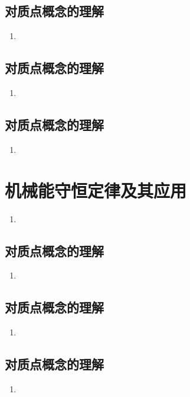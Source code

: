 \documentclass[cn,11pt]{elegantbook}
\begin{document}
\section{对质点概念的理解}
\begin{enumerate}
   \item 
\end{enumerate}

\section{对质点概念的理解}
\begin{enumerate}
   \item 
\end{enumerate}

\section{对质点概念的理解}
\begin{enumerate}
   \item 
\end{enumerate}


\chapter{机械能守恒定律及其应用}
\begin{enumerate}
   \item 
\end{enumerate}

\section{对质点概念的理解}
\begin{enumerate}
   \item 
\end{enumerate}

\section{对质点概念的理解}
\begin{enumerate}
   \item 
\end{enumerate}

\section{对质点概念的理解}
\begin{enumerate}
   \item 
\end{enumerate}
\end{document}
